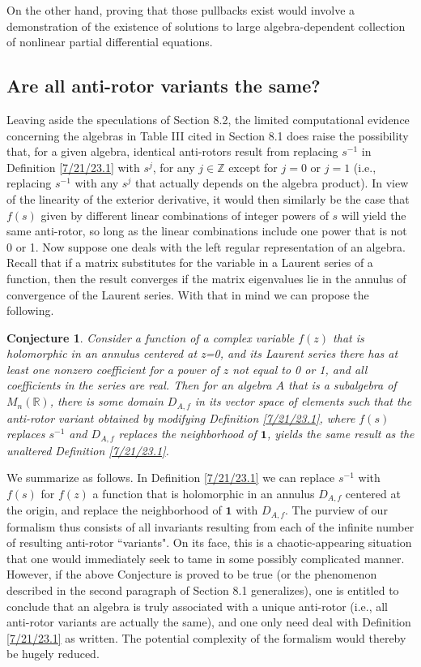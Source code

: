 \documentclass{amsart}
\theoremstyle{definition}
\newtheorem*{conjecture}{Conjecture}
\numberwithin{theorem}{section}
\numberwithin{equation}{section}
\begin{document}
On the other hand, proving that those pullbacks exist would involve a demonstration of the existence of solutions to large algebra-dependent collection of nonlinear partial differential equations.

\subsection{Are all anti-rotor variants the same?}
Leaving aside the speculations of Section 8.2, the limited computational evidence concerning the algebras in Table III cited in Section 8.1 does raise the possibility that, for a given algebra, identical anti-rotors result from replacing $s^{-1}$ in Definition \ref{7/21/23.1} with $s^j$, for any $j\in \mathbb{Z}$ except for $j = 0$ or $j=1$ (i.e., replacing $s^{-1}$ with any $s^j$ that actually depends on the algebra product). 
In view of the linearity of the exterior derivative, it would then similarly be the case that $f(s)$ given by different linear combinations of integer powers of $s$ will yield the same anti-rotor, so long as the linear combinations include one power that is not 0 or 1.  Now suppose one deals with the left regular representation of an algebra.  Recall that if a matrix substitutes for the variable in a Laurent series of a function, then the result converges if the matrix eigenvalues lie in the annulus of convergence of the Laurent series.  With that in mind we can propose the following.    

\begin{conjecture} {\it Consider a function of a complex variable $f(z)$ that is holomorphic in an annulus centered at z=0, and its Laurent series there has at least one nonzero coefficient for a power of $z$ not equal to 0 or 1, and all coefficients in the series are real.  Then for an algebra $A$ that is a subalgebra of $M_n(\mathbb{R})$, there is some domain $D_{A,f}$ in its vector space of elements such that the anti-rotor variant obtained by modifying Definition \ref{7/21/23.1}, where $f(s)$  replaces $s^{-1}$ and $D_{A,f}$ replaces the neighborhood of $\mathbf{1}$, yields the same result as the unaltered Definition \ref{7/21/23.1}.}  \end{conjecture}
 
We summarize as follows.  
In Definition \ref{7/21/23.1} we can replace $s^{-1}$ with $f(s)$ for $f(z)$ a function that is holomorphic in an annulus $D_{A,f}$ centered at the origin, and replace the neighborhood of $\mathbf{1}$ with $D_{A,f}$.  The purview of our formalism thus consists of all invariants resulting from each of the infinite number of resulting anti-rotor ``variants".
 On its face, this is a chaotic-appearing situation that one would immediately seek to tame in some possibly complicated manner.   However, if the above Conjecture is proved to be true (or the phenomenon described in the second paragraph of Section 8.1 generalizes), one is entitled to conclude that an algebra is truly associated with a unique anti-rotor (i.e., all anti-rotor variants are actually the same), and one only need deal with Definition \ref{7/21/23.1} as written.  The potential complexity of the formalism would thereby be hugely reduced.
\end{document}
